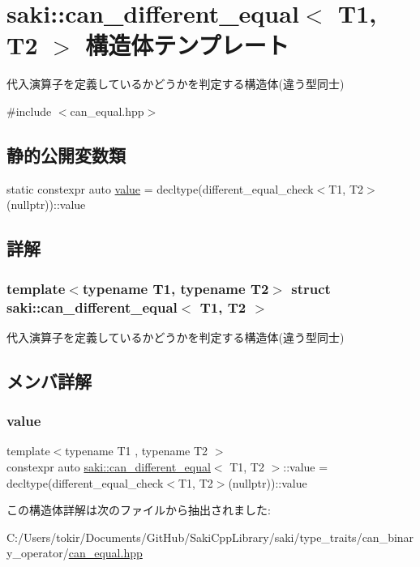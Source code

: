 \hypertarget{structsaki_1_1can__different__equal}{}\section{saki\+:\+:can\+\_\+different\+\_\+equal$<$ T1, T2 $>$ 構造体テンプレート}
\label{structsaki_1_1can__different__equal}


代入演算子を定義しているかどうかを判定する構造体(違う型同士)  




{\ttfamily \#include $<$can\+\_\+equal.\+hpp$>$}

\subsection*{静的公開変数類}
\begin{DoxyCompactItemize}
\item 
static constexpr auto \mbox{\hyperlink{structsaki_1_1can__different__equal_aedb8ce9a919590cf9254702057f352ae}{value}} = decltype(different\+\_\+equal\+\_\+check$<$T1, T2$>$(nullptr))\+::value
\end{DoxyCompactItemize}


\subsection{詳解}
\subsubsection*{template$<$typename T1, typename T2$>$\newline
struct saki\+::can\+\_\+different\+\_\+equal$<$ T1, T2 $>$}

代入演算子を定義しているかどうかを判定する構造体(違う型同士) 

\subsection{メンバ詳解}
\mbox{\label{structsaki_1_1can__different__equal_aedb8ce9a919590cf9254702057f352ae}} 
\subsubsection{\texorpdfstring{value}{value}}
{\footnotesize\ttfamily template$<$typename T1 , typename T2 $>$ \\
constexpr auto \mbox{\hyperlink{structsaki_1_1can__different__equal}{saki\+::can\+\_\+different\+\_\+equal}}$<$ T1, T2 $>$\+::value = decltype(different\+\_\+equal\+\_\+check$<$T1, T2$>$(nullptr))\+::value\hspace{0.3cm}{\ttfamily [static]}}



この構造体詳解は次のファイルから抽出されました\+:\begin{DoxyCompactItemize}
\item 
C\+:/\+Users/tokir/\+Documents/\+Git\+Hub/\+Saki\+Cpp\+Library/saki/type\+\_\+traits/can\+\_\+binary\+\_\+operator/\mbox{\hyperlink{can__equal_8hpp}{can\+\_\+equal.\+hpp}}\end{DoxyCompactItemize}
